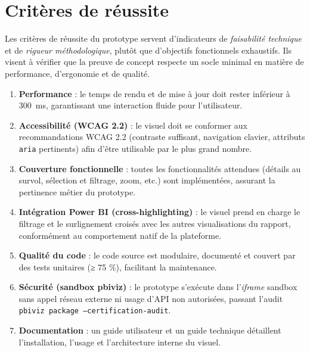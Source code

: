 \section{Critères de réussite}
\label{sec:success-criteria}

Les critères de réussite du prototype servent d’indicateurs de \textit{faisabilité
technique} et de \textit{rigueur méthodologique}, plutôt que d’objectifs
fonctionnels exhaustifs.
Ils visent à vérifier que la preuve de concept respecte un socle minimal en
matière de performance, d’ergonomie et de qualité.

\begin{enumerate}[noitemsep,topsep=0pt,label=\arabic*)]
    \item \textbf{Performance} : le temps de rendu et de mise à jour doit rester
          inférieur à 300~ms, garantissant une interaction fluide pour
          l’utilisateur.
    \item \textbf{Accessibilité (WCAG 2.2)} : le visuel doit se conformer aux
          recommandations WCAG 2.2 (contraste suffisant, navigation clavier,
          attributs \texttt{aria} pertinents) afin d’être utilisable par le
          plus grand nombre.
    \item \textbf{Couverture fonctionnelle} : toutes les fonctionnalités
          attendues (détails au survol, sélection et filtrage, zoom, etc.) sont
          implémentées, assurant la pertinence métier du prototype.
    \item \textbf{Intégration Power BI (cross-highlighting)} : le visuel prend
          en charge le filtrage et le surlignement croisés avec les autres
          visualisations du rapport, conformément au comportement natif de la
          plateforme.
    \item \textbf{Qualité du code} : le code source est modulaire, documenté et
          couvert par des tests unitaires (≥ 75 \%), facilitant la maintenance.
    \item \textbf{Sécurité (sandbox pbiviz)} : le prototype s’exécute dans
          l’\emph{iframe} sandbox sans appel réseau externe ni usage d’API non
          autorisées, passant l’audit
          \texttt{pbiviz package --certification-audit}.
    \item \textbf{Documentation} : un guide utilisateur et un guide technique
          détaillent l’installation, l’usage et l’architecture interne du
          visuel.
\end{enumerate}

